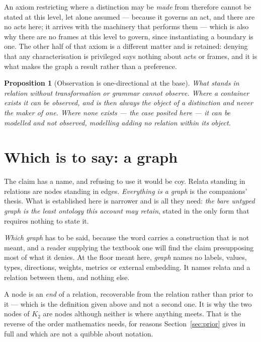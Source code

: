 \documentclass[11pt,a4paper]{article}
\newtheorem{proposition}{Proposition}
\theoremstyle{remark}\newtheorem{remark}[proposition]{Remark}
\begin{document}
An axiom restricting where a distinction may be \emph{made} from therefore cannot be stated at this
level, let alone assumed --- because it governs an act, and there are no acts here; it arrives with the
machinery that performs them --- which is also why there are no frames at this level to govern, since
instantiating a boundary is one. The other half of that axiom is a different matter and is retained:
denying that any characterisation is privileged says nothing about acts or frames, and it is what makes
the graph a result rather than a preference.

\begin{proposition}[Observation is one-directional at the base]\label{prop:one-way}
What stands in relation without transformation or grammar cannot observe. Where a container exists it
can be observed, and is then always the object of a distinction and never the maker of one. Where none
exists --- the case posited here --- \emph{it can be modelled and not observed}, modelling adding no
relation within its object.
\end{proposition}

\section{Which is to say: a graph}\label{sec:graph}
The claim has a name, and refusing to use it would be coy. Relata standing in relations are nodes
standing in edges. \emph{Everything is a graph} is the companions' thesis. What is established here is
narrower and is all they need: \emph{the bare untyped graph is the least ontology this account may
retain}, stated in the only form that requires nothing to state it.

\emph{Which graph} has to be said, because the word carries a construction that is not meant, and a
reader supplying the textbook one will find the claim presupposing most of what it denies. At the floor
meant here, \emph{graph} names no labels, values, types, directions, weights, metrics or external
embedding. It names relata and a relation between them, and nothing else.

A node is an \emph{end} of a relation, recoverable from the relation rather than prior to it --- which
is the definition given above and not a second one. It is why the two nodes of $K_2$ are nodes although
neither is where anything meets. That is the reverse of the order mathematics needs, for reasons
Section~\ref{sec:prior} gives in full and which are not a quibble about notation.
\end{document}
